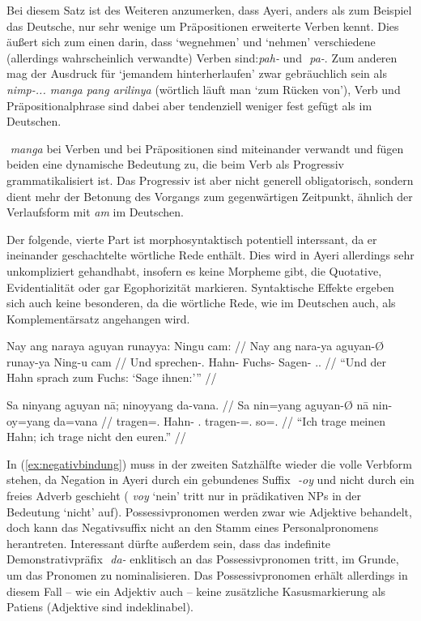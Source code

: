 \documentclass[12pt,paper=a4]{scrartcl}
\newcommand{\TsgM}{{\Tsg}.{\M}}
\newcommand{\TplM}{{\Tpl}.{\M}}
\newcommand{\fw}[1]{\textit{#1}} %
\newcommand{\zwsp}{\mbox{​}} %
\newcommand{\rayr}[2]{\zwsp\smash{{\Tagati #1}} \emph{#2}} %
\newcommand{\xayr}[3]{\zwsp\smash{\Tagati #1} \emph{#2} `#3'} %
\begin{document}
\xe

Bei diesem Satz ist des Weiteren anzumerken, dass Ayeri, anders als zum Beispiel das Deutsche, nur sehr wenige um Präpositionen erweiterte Verben kennt. Dies äußert sich zum einen darin, dass `wegnehmen' und `nehmen' verschiedene (allerdings wahrscheinlich verwandte) Verben sind: \rayr{phF/}{pah-} und \rayr{p/}{pa-}. Zum anderen mag der Ausdruck für `jemandem hinterherlaufen' zwar gebräuchlich sein als \rayr{niMpF/— mN pNF ArilinFy}{nimp-... manga pang arilinya} (wörtlich läuft man `zum Rücken von'), Verb und Präpositionalphrase sind dabei aber tendenziell weniger fest gefügt als im Deutschen.

\rayr{mN}{manga} bei Verben und bei Präpositionen sind miteinander verwandt und fügen beiden eine dynamische Bedeutung zu, die beim Verb als Progressiv grammatikalisiert ist. Das Progressiv ist aber nicht generell obligatorisch, sondern dient mehr der Betonung des Vorgangs zum gegenwärtigen Zeitpunkt, ähnlich der Verlaufsform mit \fw{am} im Deutschen.

Der folgende, vierte Part ist morphosyntaktisch potentiell interssant, da er ineinander geschachtelte wörtliche Rede enthält. Dies wird in Ayeri allerdings sehr unkompliziert gehandhabt, insofern es keine Morpheme gibt, die Quotative, Evidentialität oder gar Egophorizität markieren. Syntaktische Effekte ergeben sich auch keine besonderen, da die wörtliche Rede, wie im Deutschen auch, als Komplementärsatz angehangen wird.

\pex %
\a\begingl
	\gla Nay ang naraya aguyan runayya: Ningu cam: //
	\glb Nay ang nara-ya aguyan-Ø runay-ya Ning-u cam //
	\glc Und \AgtT{} sprechen-\TsgM{} Hahn-\Top{} Fuchs-\Loc{} Sagen-\Imp{} \TplM{}.\Dat{} //
	\glft \enquote{Und der Hahn sprach zum Fuchs: \enquote{Sage ihnen:}} //
\endgl

\a\label{ex:negativbindung}\begingl
	\gla Sa ninyang aguyan nā; ninoyyang da-vana. //
	\glb Sa nin=yang aguyan-Ø nā nin-oy=yang da=vana //
	\glc \PatT{} tragen=\Fsg{}.\Aarg{} Hahn-\Top{} \Fsg{}.\Gen{} tragen-\Neg{}=\Fsg{}.\Aarg{} so=\Spl{}.\Gen{} //
	\glft \enquote{Ich trage meinen Hahn; ich trage nicht den euren.} //
\endgl

\xe

In (\ref{ex:negativbindung}) muss in der zweiten Satzhälfte wieder die volle Verbform stehen, da Negation in Ayeri durch ein gebundenes Suffix \rayr{/Oj}{-oy} und nicht durch ein freies Adverb geschieht (\xayr{voj}{voy}{nein} tritt nur in prädikativen NPs in der Bedeutung `nicht' auf). Possessivpronomen werden zwar wie Adjektive behandelt, doch kann das Negativsuffix nicht an den Stamm eines Personalpronomens herantreten. Interessant dürfte außerdem sein, dass das indefinite Demonstrativpräfix \rayr{d/}{da-} enklitisch an das Possessivpronomen tritt, im Grunde, um das Pronomen zu nominalisieren. Das Possessivpronomen erhält allerdings in diesem Fall -- wie ein Adjektiv auch -- keine zusätzliche Kasusmarkierung als Patiens (Adjektive sind indeklinabel).
\end{document}
